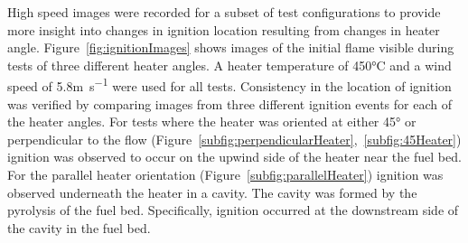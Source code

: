     High speed images were recorded for a subset of test configurations to provide more insight into changes in ignition location resulting from changes in heater angle. Figure~\ref{fig:ignitionImages} shows images of the initial flame visible during tests of three different heater angles. A heater temperature of 450\si{\celsius} and a wind speed of 5.8\si{\meter\per\second} were used for all tests. Consistency in the location of ignition was verified by comparing images from three different ignition events for each of the heater angles. For tests where the heater was oriented at either 45\si{\degree} or perpendicular to the flow (Figure~\ref{subfig:perpendicularHeater},~\ref{subfig:45Heater}) ignition was observed to occur on the upwind side of the heater near the fuel bed. For the parallel heater orientation (Figure~\ref{subfig:parallelHeater}) ignition was observed underneath the heater in a cavity. The cavity was formed by the pyrolysis of the fuel bed. Specifically, ignition occurred at the downstream side of the cavity in the fuel bed. 
